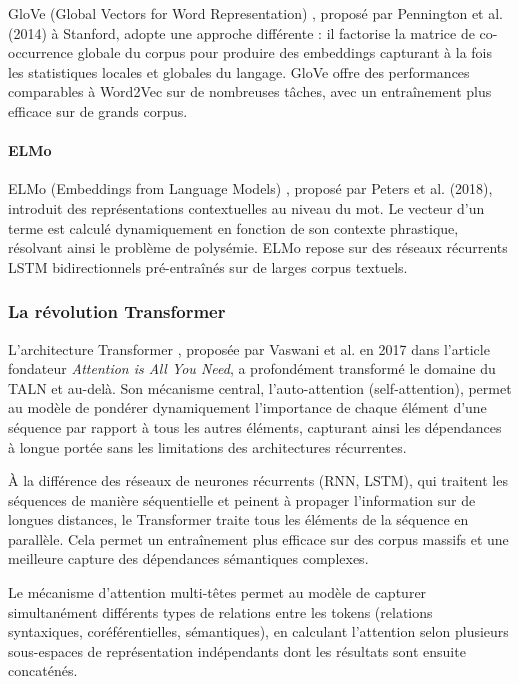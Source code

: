 GloVe (Global Vectors for Word Representation) \cite{logo:glove}, proposé par Pennington et al. (2014) à Stanford, adopte une approche différente : il factorise la matrice de co-occurrence globale du corpus pour produire des embeddings capturant à la fois les statistiques locales et globales du langage. GloVe offre des performances comparables à Word2Vec sur de nombreuses tâches, avec un entraînement plus efficace sur de grands corpus.

\paragraph{ELMo}

ELMo (Embeddings from Language Models) \cite{logo:elmo}, proposé par Peters et al. (2018), introduit des représentations contextuelles au niveau du mot. Le vecteur d'un terme est calculé dynamiquement en fonction de son contexte phrastique, résolvant ainsi le problème de polysémie. ELMo repose sur des réseaux récurrents LSTM bidirectionnels pré-entraînés sur de larges corpus textuels.

\subsubsection{La révolution Transformer}

L'architecture Transformer \cite{logo:transformer}, proposée par Vaswani et al. en 2017 dans l'article fondateur \textit{Attention is All You Need}, a profondément transformé le domaine du TALN et au-delà. Son mécanisme central, l'auto-attention (self-attention), permet au modèle de pondérer dynamiquement l'importance de chaque élément d'une séquence par rapport à tous les autres éléments, capturant ainsi les dépendances à longue portée sans les limitations des architectures récurrentes.

À la différence des réseaux de neurones récurrents (RNN, LSTM), qui traitent les séquences de manière séquentielle et peinent à propager l'information sur de longues distances, le Transformer traite tous les éléments de la séquence en parallèle. Cela permet un entraînement plus efficace sur des corpus massifs et une meilleure capture des dépendances sémantiques complexes.

Le mécanisme d'attention multi-têtes permet au modèle de capturer simultanément différents types de relations entre les tokens (relations syntaxiques, coréférentielles, sémantiques), en calculant l'attention selon plusieurs sous-espaces de représentation indépendants dont les résultats sont ensuite concaténés.

